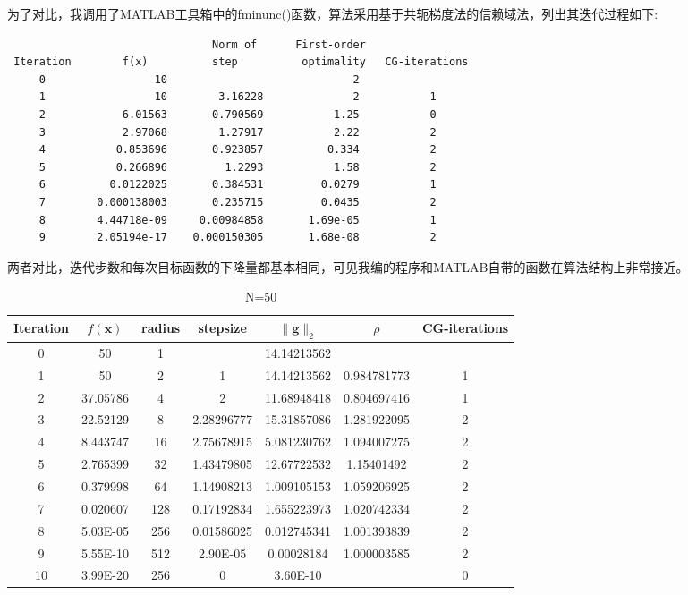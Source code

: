 为了对比，我调用了MATLAB工具箱中的fminunc()函数，算法采用基于共轭梯度法的信赖域法，列出其迭代过程如下:

\begin{lstlisting}
                                Norm of      First-order 
 Iteration        f(x)          step          optimality   CG-iterations
     0                 10                             2                
     1                 10        3.16228              2           1
     2            6.01563       0.790569           1.25           0
     3            2.97068        1.27917           2.22           2
     4           0.853696       0.923857          0.334           2
     5           0.266896         1.2293           1.58           2
     6          0.0122025       0.384531         0.0279           1
     7        0.000138003       0.235715         0.0435           2
     8        4.44718e-09     0.00984858       1.69e-05           1
     9        2.05194e-17    0.000150305       1.68e-08           2
\end{lstlisting}

两者对比，迭代步数和每次目标函数的下降量都基本相同，可见我编的程序和MATLAB自带的函数在算法结构上非常接近。
\newpage
\begin{table}[htbp]
  \centering
 \caption{N=50}
    \begin{tabular}{ccccccc}
    \toprule
    Iteration&$f(\bm{x})$&radius&stepsize&$\|\bm{g}\|_2$&$\rho$&CG-iterations \\
    \midrule
    0     & 50    & 1     &      & 14.14213562 &      &  \\
    1     & 50    & 2     & 1     & 14.14213562 & 0.984781773 & 1 \\
    2     & 37.05786 & 4     & 2     & 11.68948418 & 0.804697416 & 1 \\
    3     & 22.52129 & 8     & 2.28296777 & 15.31857086 & 1.281922095 & 2 \\
    4     & 8.443747 & 16    & 2.75678915 & 5.081230762 & 1.094007275 & 2 \\
    5     & 2.765399 & 32    & 1.43479805 & 12.67722532 & 1.15401492 & 2 \\
    6     & 0.379998 & 64    & 1.14908213 & 1.009105153 & 1.059206925 & 2 \\
    7     & 0.020607 & 128   & 0.17192834 & 1.655223973 & 1.020742334 & 2 \\
    8     & 5.03E-05 & 256   & 0.01586025 & 0.012745341 & 1.001393839 & 2 \\
    9     & 5.55E-10 & 512   & 2.90E-05 & 0.00028184 & 1.000003585 & 2 \\
    10    & 3.99E-20 & 256   & 0     & 3.60E-10 &    & 0 \\
     \bottomrule
    \end{tabular}%
  \label{tab:addlabe2}%
\end{table}%


